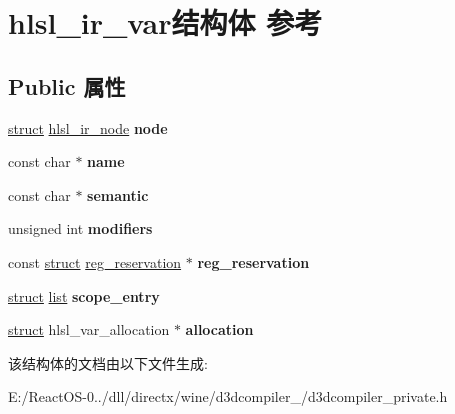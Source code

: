 \hypertarget{structhlsl__ir__var}{}\section{hlsl\+\_\+ir\+\_\+var结构体 参考}
\label{structhlsl__ir__var}
\subsection*{Public 属性}
\begin{DoxyCompactItemize}
\item 
\mbox{\label{structhlsl__ir__var_a2069897dbeeac5cd5e7d77499e718701}} 
\hyperlink{interfacestruct}{struct} \hyperlink{structhlsl__ir__node}{hlsl\+\_\+ir\+\_\+node} {\bfseries node}
\item 
\mbox{\label{structhlsl__ir__var_a407e40381cce6bd210b4ba6a41cc5e62}} 
const char $\ast$ {\bfseries name}
\item 
\mbox{\label{structhlsl__ir__var_a57d1f62e45edbb8ed7399b30311a3c2c}} 
const char $\ast$ {\bfseries semantic}
\item 
\mbox{\label{structhlsl__ir__var_aca2e8b344c6c1f6b6e5f77802016fb6e}} 
unsigned int {\bfseries modifiers}
\item 
\mbox{\label{structhlsl__ir__var_afd180ad150de7251cd613c744116373d}} 
const \hyperlink{interfacestruct}{struct} \hyperlink{structreg__reservation}{reg\+\_\+reservation} $\ast$ {\bfseries reg\+\_\+reservation}
\item 
\mbox{\label{structhlsl__ir__var_acde6a79eda7a24ed3bc6c8ee3bf803cb}} 
\hyperlink{interfacestruct}{struct} \hyperlink{classlist}{list} {\bfseries scope\+\_\+entry}
\item 
\mbox{\label{structhlsl__ir__var_a52375c4a3e89a9aacdf156cabee34986}} 
\hyperlink{interfacestruct}{struct} hlsl\+\_\+var\+\_\+allocation $\ast$ {\bfseries allocation}
\end{DoxyCompactItemize}


该结构体的文档由以下文件生成\+:\begin{DoxyCompactItemize}
\item 
E\+:/\+React\+O\+S-\/0../dll/directx/wine/d3dcompiler\+\_/d3dcompiler\+\_\+private.\+h\end{DoxyCompactItemize}
